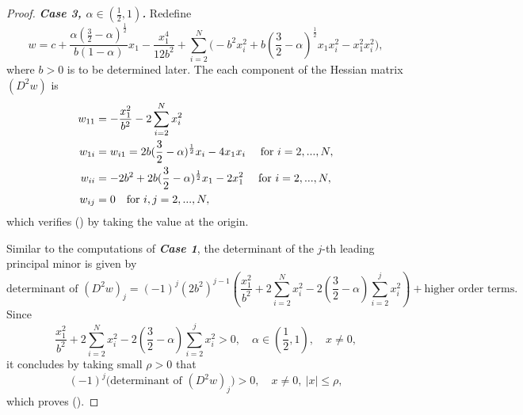 \documentclass[10pt]{article}         %
\numberwithin{equation}{section}
\begin{document}
\begin{proof}
\noindent\textbf{\emph{Case 3, $\alpha\in(\frac{1}{2},1)$.}}     Redefine 
\[w=c+\frac{\alpha(\frac{3}{2}-\alpha)^{\frac{1}{2}}}{b(1-\alpha)}x_1-\frac{x_1^4}{12b^2}+\sum\limits_{i=2}^{N}\big(-b^2x_i^2+b(\frac{3}{2}-\alpha)^{\frac{1}{2}}x_1x_i^2-x_1^2x_i^2\big),\]
where $b>0$ is to be determined later. The each component of the Hessian matrix $(D^2w)$ is 
\begin{align}
w_{11}&=-\frac{x_1^2}{b^2}-2\sum\limits_{i=2}^{N}x_i^2\notag\\
w_{1i}&=w_{i1}=2b(\frac{3}{2}-\alpha)^{\frac{1}{2}}x_i-4x_1x_i\quad\text{ for }i=2,...,N,\notag\\
w_{ii}&=-2b^2+2b(\frac{3}{2}-\alpha)^{\frac{1}{2}}x_1-2x_1^2\quad\text{ for }i=2,...,N,\notag\\
w_{ij}&=0\quad \text{for }i,j=2,...,N,\notag
\end{align}
which verifies (\expandafter{}) by taking the value at the origin.

\vspace{2mm}

Similar to the computations of \textbf{\emph{Case 1}}, the determinant of the $j$-th leading principal minor is given by 
\[\text{determinant of } (D^2w)_j=(-1)^{j}(2b^2)^{j-1}(\frac{x_1^2}{b^2}+2\sum\limits_{i=2}^Nx_i^2-2(\frac{3}{2}-\alpha)\sum\limits_{i=2}^{j}x_i^2)+\text{higher order terms}.\]
Since 
\[\frac{x_1^2}{b^2}+2\sum\limits_{i=2}^Nx_i^2-2(\frac{3}{2}-\alpha)\sum\limits_{i=2}^{j}x_i^2>0,\quad\alpha\in (\frac{1}{2},1),\quad x\neq0,\]
it concludes by taking small $\rho>0$ that 
\[(-1)^j\big(\text{determinant of } (D^2w)_j\big)>0,\quad x\neq0,\ |x|\leq \rho,\]
which proves (\expandafter{}).

\vspace{2mm}


\end{proof}
\end{document}
